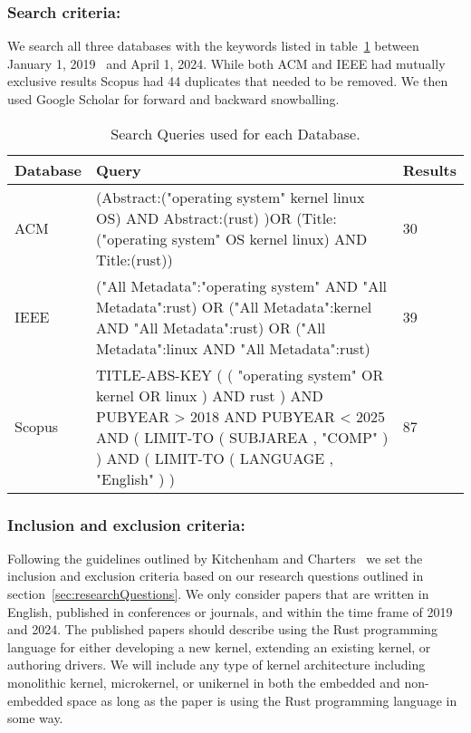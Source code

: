 \documentclass[sigconf]{acmart}
\begin{document}
\subsubsection{Search criteria:}

We search all three databases with the keywords listed in table~\ref{tab:keywords} between January
1, 2019~\cite{Gaynor2019-dk} and April 1, 2024. While both ACM and IEEE had mutually exclusive
results Scopus had 44 duplicates that needed to be removed. We then used Google Scholar for forward
and backward snowballing.

\begin{table}
\begin{tabular}{|| p{2cm}| p{4cm} | p{1cm} ||}
 \hline
 Database & Query & Results \\
 \hline\hline
 ACM  & (Abstract:("operating system" kernel linux OS) AND Abstract:(rust) )OR (Title:("operating
 system" OS kernel linux) AND Title:(rust))  & 30 \\
 IEEE & ("All Metadata":"operating system" AND "All Metadata":rust) OR ("All Metadata":kernel AND
 "All Metadata":rust) OR ("All Metadata":linux AND "All Metadata":rust) & 39 \\
 Scopus & TITLE-ABS-KEY ( ( "operating system" OR kernel OR linux ) AND rust ) AND PUBYEAR > 2018
 AND PUBYEAR < 2025 AND ( LIMIT-TO ( SUBJAREA , "COMP" ) ) AND ( LIMIT-TO ( LANGUAGE , "English" ) )
 & 87 \\
 \hline
\end{tabular}
\caption{Search Queries used for each Database.}
\label{tab:keywords}
\end{table}

\subsubsection{Inclusion and exclusion criteria:}

Following the guidelines outlined by Kitchenham and Charters~\cite{Stuart2007-cc} we set the
inclusion and exclusion criteria based on our research questions outlined in
section~\ref{sec:researchQuestions}. We only consider papers that are written in English, published
in conferences or journals, and within the time frame of 2019 and 2024. The published papers should
describe using the Rust programming language for either developing a new kernel, extending an
existing kernel, or authoring drivers. We will include any type of kernel architecture including
monolithic kernel, microkernel, or unikernel in both the embedded and non-embedded space as long as
the paper is using the Rust programming language in some way.
\end{document}
